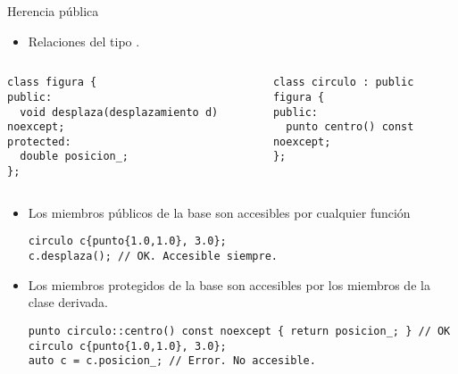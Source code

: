 \begin{frame}[t,fragile]{Herencia pública}
\begin{itemize}
  \item Relaciones del tipo .
\end{itemize}

\begin{columns}[T]
\begin{lstlisting}
class figura {
public:
  void desplaza(desplazamiento d) noexcept;
protected:
  double posicion_;
};
\end{lstlisting}
\begin{lstlisting}
class circulo : public figura { 
public:
  punto centro() const noexcept;
};
\end{lstlisting}
\end{columns}

\begin{itemize}
  \item Los miembros públicos de la base 
        son accesibles por cualquier función
\begin{lstlisting}
circulo c{punto{1.0,1.0}, 3.0};
c.desplaza(); // OK. Accesible siempre.
\end{lstlisting}

  \item Los miembros protegidos de la base 
        son accesibles por los miembros de la clase derivada.
\begin{lstlisting}
punto circulo::centro() const noexcept { return posicion_; } // OK
circulo c{punto{1.0,1.0}, 3.0};
auto c = c.posicion_; // Error. No accesible.
\end{lstlisting}

\end{itemize}
\end{frame}

